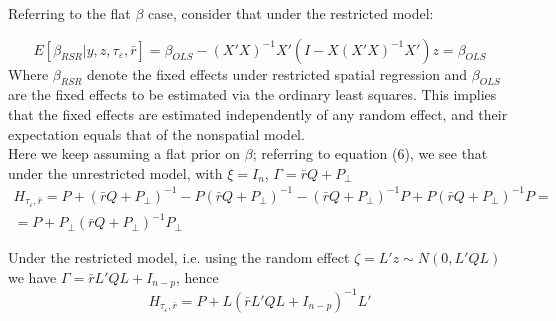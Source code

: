 \documentclass{article}
\begin{document}
Referring to the flat $\beta$ case, consider that under the restricted model:

$$
E[\beta_{RSR} | y, z, \tau_{\varepsilon}, \bar{r}] = \beta_{OLS} - (X'X)^{-1} X'(I - X(X'X)^{-1}X')z = \beta_{OLS}
$$
Where $\beta_{RSR}$ denote the fixed effects under restricted spatial regression and $\beta_{OLS}$ are the fixed effects to be estimated via the ordinary least squares.
This implies that the fixed effects are estimated independently of any random effect, and their expectation equals that of the nonspatial model.\\
Here we keep assuming a flat prior on $\beta$; referring to equation (6), we see that under the  unrestricted model, with $\xi = I_n$, $\Gamma = \bar{r} Q + P_{\bot}$
\begin{align*}
H_{\tau_{\varepsilon}, \bar{r}} = P + (\bar{r} Q + P_{\bot})^{-1} - P (\bar{r} Q + P_{\bot})^{-1} - (\bar{r} Q + P_{\bot})^{-1} P + P (\bar{r} Q + P_{\bot})^{-1}P = \\
= P + P_{\bot} (\bar{r} Q + P_{\bot})^{-1} P_{\bot}
\end{align*}

Under the restricted model, i.e. using the random effect $\zeta = L'z \sim N(0, L'QL)$ we have $\Gamma = \bar{r} L'QL + I_{n-p}$, hence 
$$
H_{\tau_{\varepsilon}, \bar{r}} 
= P + L (\bar{r} L'QL + I_{n-p})^{-1} L'
$$
 
\end{document}
